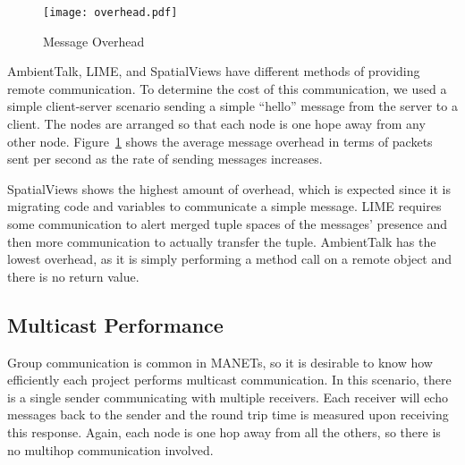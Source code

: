 \documentclass{sig-alternate}
\begin{document}
\begin{figure}
\texttt{[image: overhead.pdf]}
\caption{Message Overhead}
\label{fig:overhead}
\end{figure}

AmbientTalk, LIME, and SpatialViews have different methods of providing remote communication. To determine the cost of this communication, we used a simple client-server scenario sending a simple ``hello'' message from the server to a client. The nodes are arranged so that each node is one hope away from any other node.  Figure~\ref{fig:overhead} shows the average message overhead in terms of packets sent per second as the rate of sending messages increases. 

SpatialViews shows the highest amount of overhead, which is expected since it is migrating code and variables to communicate a simple message. LIME requires some communication to alert merged tuple spaces of the messages' presence and then more communication to actually transfer the tuple. AmbientTalk has the lowest overhead, as it is simply performing a method call on a remote object and there is no return value.

\subsection{Multicast Performance}

Group communication is common in MANETs, so it is desirable to know how efficiently each project performs multicast communication. In this scenario, there is a single sender communicating with multiple receivers. Each receiver will echo messages back to the sender and the round trip time is measured upon receiving this response. Again, each node is one hop away from all the others, so there is no multihop communication involved.

\begin{comment}
Surprisingly, this graph is the opposite of Figure~\ref{fig:overhead}. Although SpatialViews had the highest message overhead, it is able to send and receive messages considerably faster than LIME and AmbientTalk. AmbientTalk is the slowest although it has the lowest overhead, and LIME remains in the middle. This is likely due to their implementations, as SpatialViews uses a virtual machine written mostly in C, while AmbientTalk is currently implemented as an interpreter in Java. LIME is simply a Java library, so it performs fairly well but slower than SpatialViews as LIME is running on the full Java virtual machine.
\end{comment}
\end{document}
